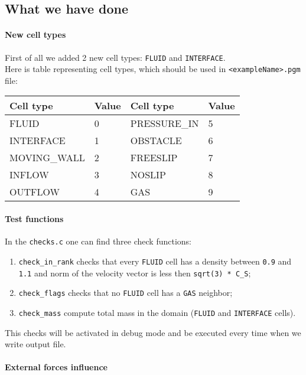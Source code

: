 \documentclass{article}
\begin{document}
\subsection{What we have done}\label{what-we-have-done}

\paragraph{New cell types}\label{new-cell-types}

First of all we added 2 new cell types: \texttt{FLUID} and
\texttt{INTERFACE}.\\
Here is table representing cell types, which should be used in
\texttt{\textless{}exampleName\textgreater{}.pgm} file:

\begin{longtable}[]{@{}llll@{}}
\toprule
Cell type & Value & Cell type & Value\tabularnewline
\midrule
\endhead
FLUID & 0 & PRESSURE\_IN & 5\tabularnewline
INTERFACE & 1 & OBSTACLE & 6\tabularnewline
MOVING\_WALL & 2 & FREESLIP & 7\tabularnewline
INFLOW & 3 & NOSLIP & 8\tabularnewline
OUTFLOW & 4 & GAS & 9\tabularnewline
\bottomrule
\end{longtable}

\paragraph{Test functions}\label{test-functions}

In the \texttt{checks.c} one can find three check functions:

\begin{enumerate}
\tightlist
\item
  \texttt{check\_in\_rank} checks that every \texttt{FLUID} cell has a
  density between \texttt{0.9} and \texttt{1.1} and norm of the velocity
  vector is less then \texttt{sqrt(3)\ *\ C\_S};
\item
  \texttt{check\_flags} checks that no \texttt{FLUID} cell has a
  \texttt{GAS} neighbor;
\item
  \texttt{check\_mass} compute total mass in the domain (\texttt{FLUID}
  and \texttt{INTERFACE} cells).
\end{enumerate}

This checks will be activated in debug mode and be executed every time
when we write output file.

\paragraph{External forces influence}\label{external-forces-influence}
\end{document}
